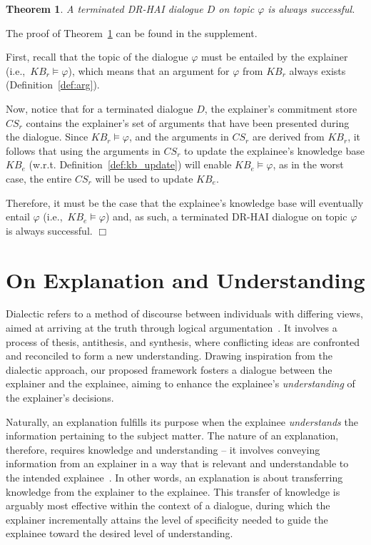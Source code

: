\documentclass[letterpaper]{article} %
\newtheorem{theorem}{{\bf Theorem}}
\newenvironment{skproof}{\noindent {\sc Proof (sketch).}}{\hfill$\Box$}
\begin{document}
\begin{theorem}
    A terminated DR-HAI dialogue $D$ on topic $\varphi$ is always successful.
    \label{succ_theo}
\end{theorem}

The proof of Theorem~\ref{succ_theo} can be found in the supplement.


 \begin{skproof}
 First, recall that the topic of the dialogue $\varphi$ must be entailed by the explainer (i.e.,~$KB_r \models \varphi$), which means that an argument for $\varphi$ from $KB_r$ always exists (Definition~\ref{def:arg}).

 Now, notice that for a terminated dialogue $D$, the explainer's commitment store $CS_r$ contains the explainer's set of arguments that have been presented during the dialogue. Since $KB_r \models \varphi$, and the arguments in $CS_r$ are derived from $KB_r$, it follows that using the arguments in $CS_r$ to update the explainee's knowledge base $KB_e$ (w.r.t. Definition~\ref{def:kb_update}) will enable $KB_e \models \varphi$, as in the worst case, the entire $CS_r$ will be used to update $KB_e$.

 Therefore, it must be the case that the explainee's knowledge base will eventually entail $\varphi$ (i.e.,~$KB_e \models \varphi$) and, as such, a terminated DR-HAI dialogue on topic $\varphi$ is always successful.   
 \end{skproof}





\section{On Explanation and Understanding}
\label{understand}

 Dialectic refers to a method of discourse between individuals with differing views, aimed at arriving at the truth through logical argumentation~\cite{arg_handbook}. It involves a process of thesis, antithesis, and synthesis, where conflicting ideas are confronted and reconciled to form a new understanding. Drawing inspiration from the dialectic approach, our proposed framework fosters a dialogue between the explainer and the explainee, aiming to enhance the explainee's \textit{understanding} of the explainer's decisions.


 Naturally, an explanation fulfills its purpose when the explainee \emph{understands} the information pertaining to the subject matter. The nature of an explanation, therefore, requires knowledge and understanding -- it involves conveying information from an explainer in a way that is relevant and understandable to the intended explainee~\cite{craik1967nature}. In other words, an explanation is about transferring knowledge from the explainer to the explainee. This transfer of knowledge is arguably most effective within the context of a dialogue, during which the explainer incrementally attains the level of specificity needed to guide the explainee toward the desired level of understanding.
\end{document}
